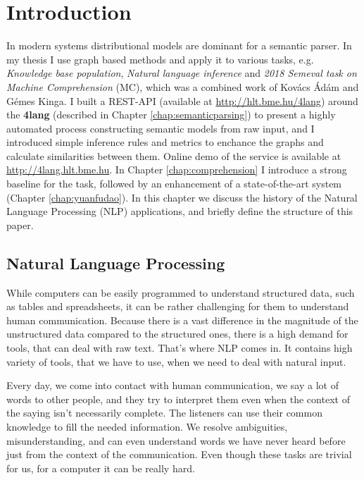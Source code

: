 \chapter{Introduction}
\label{chap:Introdu}
In modern systems distributional models are dominant for a semantic parser. In my thesis I use graph based methods and 
apply it to various tasks, e.g. \textit{Knowledge base population}, \textit{Natural language inference} and \textit{2018 Semeval task on Machine Comprehension} (MC), which was a combined work of Kov\'acs \'Ad\'am and G\'emes Kinga.
I built a REST-API (available at \url{http://hlt.bme.hu/4lang}) 
around the \textbf{4lang}\cite{Recski:2016} (described in Chapter \ref{chap:semanticparsing}) 
to present a highly automated process constructing semantic models from raw input, and I introduced simple inference rules and metrics to enchance the graphs and calculate similarities between them.
Online demo of the service is available at \url{http://4lang.hlt.bme.hu}. 
In Chapter \ref{chap:comprehension} I introduce a strong baseline for the task, 
followed by an enhancement of a state-of-the-art system \cite{Wang:2018} (Chapter \ref{chap:yuanfudao}). 
In this chapter we discuss the history of the Natural Language Processing (NLP) applications, 
and briefly define the structure of this paper.
\section{Natural Language Processing}
While computers can be easily programmed to understand structured data, such as tables and spreadsheets, it can be rather challenging for them
to understand human communication. Because there is a vast difference in the magnitude of the unstructured data compared to the structured ones, there is a high demand
for tools, that can deal with raw text. That's where NLP comes in. It contains high variety of tools, that we have to use, when we need to deal with natural input.

Every day, we come into contact with human communication, we say a lot of words to other people, and they try to interpret them even when the context of the saying 
isn't necessarily complete. The listeners can use their common knowledge to fill the needed information. We resolve ambiguities, misunderstanding, and can even understand words 
we have never heard before just from the context of the communication.
Even though these tasks are trivial for us, for a computer it can be really hard.

